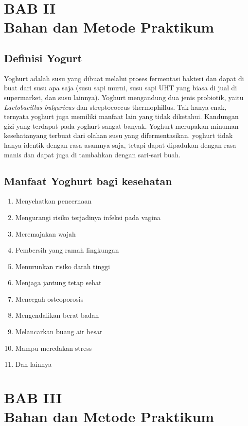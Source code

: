 \documentclass[a4paper,12pt, left=3cm,right=2cm,bottom=2cm, bahasa]{article}
\begin{document}
\section*{BAB II \\ Bahan dan Metode Praktikum}
\subsection{Definisi Yogurt}
Yoghurt adalah susu yang dibuat melalui proses fermentasi bakteri dan dapat di buat dari susu apa saja (susu sapi murni, susu sapi UHT yang biasa di jual di supermarket, dan susu lainnya). Yoghurt mengandung dua jenis probiotik, yaitu \textit{Lactobacillus bulgaricus} dan streptococcus thermophillus. Tak hanya enak, ternyata yoghurt juga memiliki manfaat lain yang tidak diketahui. Kandungan gizi yang terdapat pada yoghurt sangat banyak.
Yoghurt merupakan minuman kesehatanyang terbuat dari olahan susu yang difermentasikan. yoghurt tidak hanya identik dengan rasa asamnya saja, tetapi dapat dipadukan dengan rasa manis dan dapat juga di tambahkan dengan sari-sari buah.
\subsection{Manfaat Yoghurt bagi kesehatan}
\begin{enumerate}
\item Menyehatkan pencernaan
\item Mengurangi risiko terjadinya infeksi pada vagina
\item Meremajakan wajah
\item Pembersih yang ramah lingkungan
\item Menurunkan risiko darah tinggi
\item Menjaga jantung tetap sehat
\item Mencegah osteoporosis
\item Mengendalikan berat badan
\item Melancarkan buang air besar
\item Mampu meredakan stress
\item Dan lainnya
\end{enumerate}
\pagebreak
\setcounter{subsection}{0}
\setcounter{section}{3}
\section*{BAB III \\ Bahan dan Metode Praktikum}
\end{document}
